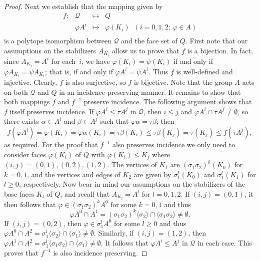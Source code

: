 \documentclass[12pt]{article}
\theoremstyle{definition}\newtheorem{definition}{Definition}[section]
\begin{document}
\begin{proof}
Next we establish that the mapping given by 
$$\begin{array}{rlcl}
f: & \mathcal{Q} &\mapsto &Q \\
   & \varphi A^i &\mapsto &\varphi(K_i)\;\; (i=0,1,2;\,\varphi\in A)\\
\end{array}$$
is a polytope isomorphism between $\mathcal{Q}$ and the face set of $Q$. First note that our assumptions on the stabilizers $A_{K_i}$ allow us to prove that $f$ is a bijection. In fact, since $A_{K_i}=A^i$ for each~$i$, we have $\varphi(K_i)=\psi(K_i)$ if and only if $\varphi A_{K_i}=\psi A_{K_i}$; that is, if and only if $\varphi A^i =\psi A^i$. Thus $f$ is well-defined and injective. Clearly, $f$ is also surjective, so $f$ is bijective. Note that the group $A$ acts on both $\mathcal{Q}$ and $Q$ in an incidence preserving manner. It remains to show that both mappings $f$ and $f^{-1}$ preserve incidence. The following argument shows that $f$ itself preserves incidence. If $\varphi A^i \leq \tau A^j$ in $\mathcal{Q}$, then $i\leq j$ and $\varphi A^i \cap \tau A^j \neq \emptyset$, so there exists $\alpha \in A^i$ and $\beta \in A^j$ such that $\varphi \alpha = \tau \beta$; then 
$$f(\varphi A^i) = \varphi (K_i) = \varphi \alpha (K_i) = \tau \beta (K_i) \leq \tau \beta (K_j) = \tau (K_j) \leq f(\tau A^j),$$ 
as required. For the proof that $f^{-1}$ also preserves incidence we only need to consider faces $\varphi(K_i)$ of $Q$ with $\varphi(K_i)\leq K_j$ where $(i,j)=(0,1),(0,2),(1,2)$. The vertices of $K_1$ are $(\sigma_1\sigma_2)^{k}(K_0)$ for $k=0,1$, and the vertices and edges of $K_2$ are given by $\sigma_1^l(K_0)$ and $\sigma_1^l(K_1)$ for $l\geq 0$, respectively. Now bear in mind our assumptions on the stabilizers of the base faces $K_{l}$ of $Q$, and recall that $A_{K_l}=A^l$ for $l=0,1,2$. If $(i,j)=(0,1)$, it then follows that  
$\varphi\in (\sigma_1\sigma_2)^{k}A^{0}$ for some $k=0,1$ and thus
$$\varphi A^0\cap A^1 = (\sigma_1\sigma_2)^{k}\langle\sigma_2\rangle
\cap\langle\sigma_{1}\sigma_2\rangle\neq\emptyset.$$ If $(i,j)=(0,2)$, then 
$\varphi\in \sigma_1^{l}A^{0}$ for some $l\geq 0$ and thus 
$\varphi A^{0}\cap A^2 
= \sigma_1^{l}\langle\sigma_2\rangle \cap \langle\sigma_1\rangle\neq\emptyset$. Similarly, if $(i,j)=(1,2)$, then 
$\varphi A^{1}\cap A^2 
= \sigma_1^{l}\langle\sigma_1\sigma_2\rangle \cap \langle\sigma_1\rangle\neq\emptyset$. It follows that $\varphi A^i \leq A^j$ in $\mathcal{Q}$ in each case. This proves that $f^{-1}$ is also incidence preserving. \smallskip


\end{proof}
\end{document}
